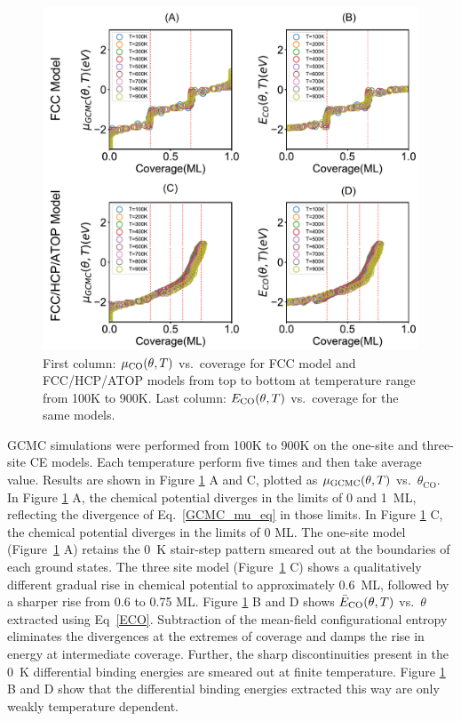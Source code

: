 \documentclass[11pt]{article}
\begin{document}
\begin{figure} [h]
\centering
\includegraphics[width=15cm]{Figure/GCMC1.pdf}
\caption{First column: $\mu_{\ce{CO}}(\theta,T)$ vs.\ coverage for FCC model and FCC/HCP/ATOP models from top to bottom at temperature range from 100K to 900K. Last column: $E_{\ce{CO}}(\theta,T)$ vs.\ coverage for the same models.}
\label{sumgcmc}
\end{figure}

\noindent
GCMC simulations were performed from 100K to 900K on the one-site and three-site CE models. Each temperature perform five times and then take average value. Results are shown in Figure \ref{sumgcmc} A and C, plotted as $\mu_{\ce{GCMC}}(\theta,T)$ vs.\ $\theta_{\text{CO}}$. 
In Figure \ref{sumgcmc} A, the chemical potential diverges in the limits of 0 and 1~ML, reflecting the divergence of Eq.~\ref{GCMC_mu_eq} in those limits. In Figure \ref{sumgcmc} C, the chemical potential diverges in the limits of 0 ML.
The one-site model (Figure~\ref{sumgcmc} A) retains the 0~K stair-step pattern smeared out at the boundaries of each ground states. The three site model (Figure~\ref{sumgcmc} C) shows a qualitatively different gradual rise in chemical potential to approximately 0.6~ML, followed by a sharper rise from 0.6 to 0.75 ML.
Figure \ref{sumgcmc} B and D shows $\bar{E}_{\ce{CO}}(\theta,T)$ vs.\ $\theta$ extracted using Eq~\ref{ECO}. Subtraction of the mean-field configurational entropy eliminates the divergences at the extremes of coverage and damps the rise in energy at intermediate coverage. Further, the sharp discontinuities present in the 0~K differential binding energies are smeared out at finite temperature. Figure \ref{sumgcmc} B and D show that the differential binding energies extracted this way are only weakly temperature dependent. 
\end{document}
